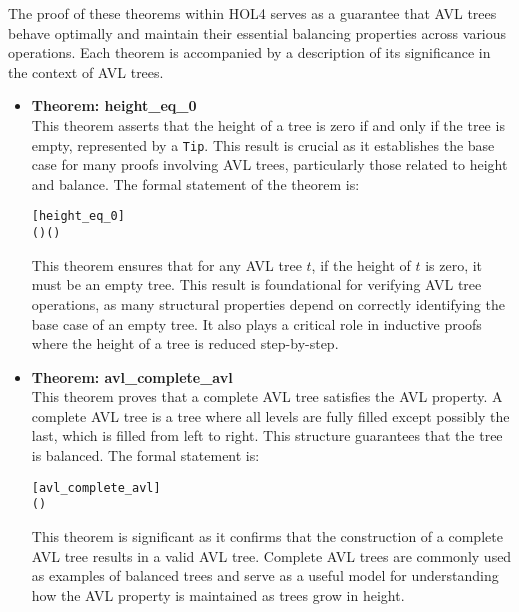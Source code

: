 \documentclass[12pt]{article}
\begin{document}
The proof of these theorems within HOL4 serves as a guarantee that AVL trees behave optimally and maintain their essential balancing properties across various operations. Each theorem is accompanied by a description of its significance in the context of AVL trees.

\begin{itemize}

  \item \textbf{Theorem: height\_eq\_0} \\
  This theorem asserts that the height of a tree is zero if and only if the tree is empty, represented by a \texttt{Tip}. This result is crucial as it establishes the base case for many proofs involving AVL trees, particularly those related to height and balance. The formal statement of the theorem is:

\begin{alltt}
[height_eq_0]
\HOLTokenTurnstile{} (  \HOLSymConst{=}  \HOLSymConst{\HOLTokenEquiv{}}  \HOLSymConst{=} ) \HOLSymConst{\HOLTokenConj{}} ( \HOLSymConst{=}   \HOLSymConst{\HOLTokenEquiv{}}  \HOLSymConst{=} )
\end{alltt}

  This theorem ensures that for any AVL tree \( t \), if the height of \( t \) is zero, it must be an empty tree. This result is foundational for verifying AVL tree operations, as many structural properties depend on correctly identifying the base case of an empty tree. It also plays a critical role in inductive proofs where the height of a tree is reduced step-by-step.

  \item \textbf{Theorem: avl\_complete\_avl} \\
  This theorem proves that a complete AVL tree satisfies the AVL property. A complete AVL tree is a tree where all levels are fully filled except possibly the last, which is filled from left to right. This structure guarantees that the tree is balanced. The formal statement is:

\begin{alltt}
[avl_complete_avl]
\HOLTokenTurnstile{}  ( ) \HOLSymConst{\HOLTokenEquiv{}} 
\end{alltt}

  This theorem is significant as it confirms that the construction of a complete AVL tree results in a valid AVL tree. Complete AVL trees are commonly used as examples of balanced trees and serve as a useful model for understanding how the AVL property is maintained as trees grow in height.


\end{itemize}
\end{document}
